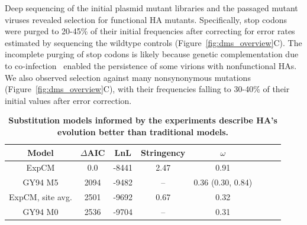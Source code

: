 \documentclass[9pt,twocolumn,twoside]{pnas-new}
\begin{document}
Deep sequencing of the initial plasmid mutant libraries and the passaged mutant viruses revealed selection for functional HA mutants.
Specifically, stop codons were purged to 20-45\% of their initial frequencies after correcting for error rates estimated by sequencing the wildtype controls (Figure~\ref{fig:dms_overview}C).
The incomplete purging of stop codons is likely because genetic complementation due to co-infection~\cite{marshall2013influenza, brooke2013most} enabled the persistence of some virions with nonfunctional HAs.
We also observed selection against many nonsynonymous mutations (Figure~\ref{fig:dms_overview}C), with their frequencies falling to 30-40\% of their initial values after error correction.

\begin{table}[b!]
\caption{\label{tab:phydms}
{\bf Substitution models informed by the experiments describe HA's evolution better than traditional models.}}
\begin{center}
\begin{tabular}{cccccccc}
\hline
\bf{Model} & \bf{$\Delta$AIC} & \bf{LnL} & \bf{Stringency} & \bf{$\omega$}  \\ \hline
ExpCM & 0.0 & -8441 & 2.47 & 0.91 \\
GY94 M5 & 2094 & -9482 & -- & 0.36 (0.30, 0.84) \\
ExpCM, site avg. & 2501 & -9692 & 0.67 & 0.32 \\
GY94 M0 & 2536 & -9704 & -- & 0.31 \\
\hline
\end{tabular}
 \end{center}
\end{table}
\end{document}
